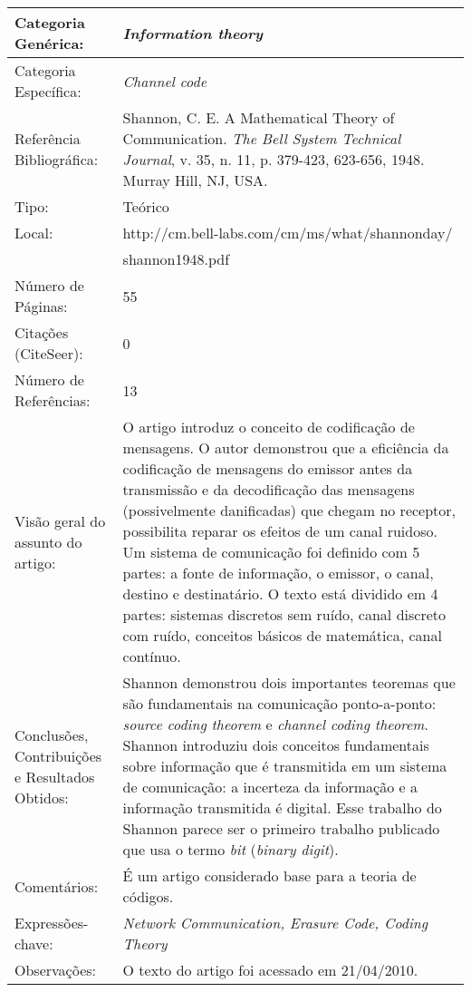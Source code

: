 \documentclass[10pt,a4paper]{article}
\begin{document}
\begin{center}
\begin{tabular}{|p{5cm}||p{10cm}|}
\hline

Categoria Genérica: & \emph{Information theory}\\\hline
Categoria Específica: & \emph{Channel code}\\\hline
Referência Bibliográfica: & Shannon, C. E. A Mathematical Theory of Communication. \emph{The Bell System Technical Journal}, v. 35, n. 11, p. 379-423, 623-656, 1948. Murray Hill, NJ, USA. \\\hline
Tipo: & Teórico\\\hline
Local: & http://cm.bell-labs.com/cm/ms/what/shannonday/\\ &shannon1948.pdf\\\hline
Número de Páginas: & 55\\\hline
Citações (CiteSeer): & 0\\\hline
Número de Referências: & 13\\\hline
Visão geral do assunto do artigo: & O artigo introduz o conceito de codificação de mensagens. O autor demonstrou que a eficiência da codificação de mensagens do emissor antes da transmissão e da decodificação das mensagens (possivelmente danificadas) que chegam no receptor, possibilita reparar os efeitos de um canal ruidoso. Um sistema de comunicação foi definido com 5 partes: a fonte de informação, o emissor, o canal, destino e destinatário.  O texto está dividido em 4 partes: sistemas discretos sem ruído, canal discreto com ruído, conceitos básicos de matemática, canal contínuo. \\\hline
Conclusões, Contribuições e Resultados Obtidos: & Shannon demonstrou dois importantes teoremas que são fundamentais na comunicação ponto-a-ponto: \emph{source coding theorem} e \emph{channel coding theorem}. Shannon introduziu dois conceitos fundamentais sobre informação que é transmitida em um sistema de comunicação: a incerteza da informação e a informação transmitida é digital. Esse trabalho do Shannon parece ser o primeiro trabalho publicado que usa o termo \emph{bit} (\emph{binary digit}).\\\hline
Comentários: & É um artigo considerado base para a teoria de códigos. \\\hline
Expressões-chave: & \emph{Network Communication, Erasure Code, Coding Theory}\\\hline
Observações: &  O texto do artigo foi acessado em 21/04/2010.\\\hline

\end{tabular}
\end{center}
\end{document}
